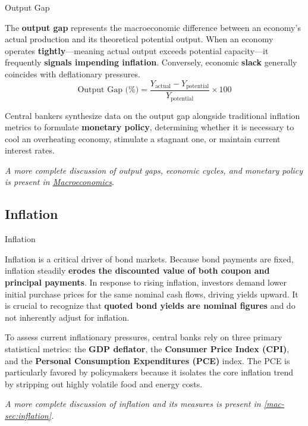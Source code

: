 \documentclass[10pt]{article}
\begin{document}
    \begin{core}{Output Gap}

      The \textbf{output gap} represents the macroeconomic difference between an economy's actual production and its theoretical potential output. When an economy operates \textbf{tightly}---meaning actual output exceeds potential capacity---it frequently \textbf{signals impending inflation}. Conversely, economic \textbf{slack} generally coincides with deflationary pressures. 
      \[
        \text{Output Gap (\%)} = \frac{Y_{\text{actual}} - Y_{\text{potential}}}{Y_{\text{potential}}} \times 100
      \]

      Central bankers synthesize data on the output gap alongside traditional inflation metrics to formulate \textbf{monetary policy}, determining whether it is necessary to cool an overheating economy, stimulate a stagnant one, or maintain current interest rates.

      \textit{A more complete discussion of output gaps, economic cycles, and monetary policy is present in \href{https://ibahng.github.io/finance_markets/macroeconomics/macroeconomics.pdf}{Macroeconomics}}.

    \end{core}

  \subsection{Inflation}

    \begin{core}{Inflation}

      Inflation is a critical driver of bond markets. Because bond payments are fixed, inflation steadily \textbf{erodes the discounted value of both coupon and principal payments}. In response to rising inflation, investors demand lower initial purchase prices for the same nominal cash flows, driving yields upward. It is crucial to recognize that \textbf{quoted bond yields are nominal figures} and do not inherently adjust for inflation. 

      To assess current inflationary pressures, central banks rely on three primary statistical metrics: the \textbf{GDP deflator}, the \textbf{Consumer Price Index (CPI)}, and the \textbf{Personal Consumption Expenditures (PCE)} index. The PCE is particularly favored by policymakers because it isolates the core inflation trend by stripping out highly volatile food and energy costs.

      \textit{A more complete discussion of inflation and its measures is present in \autoref{mac-sec:inflation}.}

    \end{core}
\end{document}

